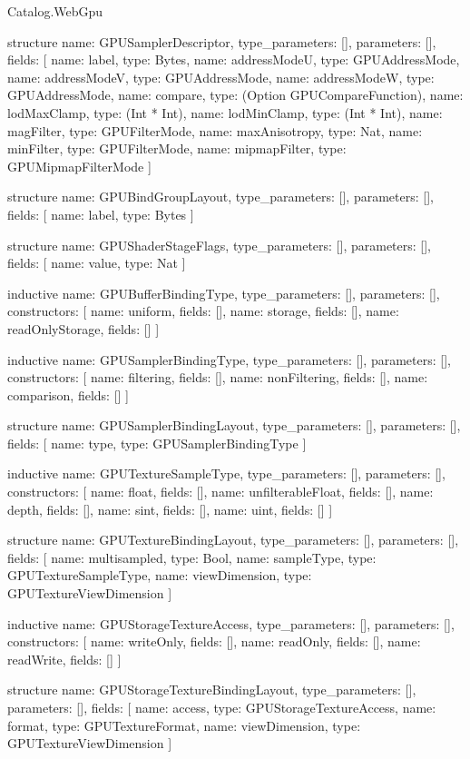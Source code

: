 \begin{lexlean}{Catalog.WebGpu}
\begin{semanticmodule}
structure{
  name: GPUSamplerDescriptor,
  type_parameters: [],
  parameters: [],
  fields: [
    {name: label, type: Bytes},
    {name: addressModeU, type: GPUAddressMode},
    {name: addressModeV, type: GPUAddressMode},
    {name: addressModeW, type: GPUAddressMode},
    {name: compare, type: (Option GPUCompareFunction)},
    {name: lodMaxClamp, type: (Int * Int)},
    {name: lodMinClamp, type: (Int * Int)},
    {name: magFilter, type: GPUFilterMode},
    {name: maxAnisotropy, type: Nat},
    {name: minFilter, type: GPUFilterMode},
    {name: mipmapFilter, type: GPUMipmapFilterMode}
  ]
}

structure{
  name: GPUBindGroupLayout,
  type_parameters: [],
  parameters: [],
  fields: [
    {name: label, type: Bytes}
  ]
}

structure{
  name: GPUShaderStageFlags,
  type_parameters: [],
  parameters: [],
  fields: [
    {name: value, type: Nat}
  ]
}

inductive{
  name: GPUBufferBindingType,
  type_parameters: [],
  parameters: [],
  constructors: [
    {name: uniform, fields: []},
    {name: storage, fields: []},
    {name: readOnlyStorage, fields: []}
  ]
}

inductive{
  name: GPUSamplerBindingType,
  type_parameters: [],
  parameters: [],
  constructors: [
    {name: filtering, fields: []},
    {name: nonFiltering, fields: []},
    {name: comparison, fields: []}
  ]
}

structure{
  name: GPUSamplerBindingLayout,
  type_parameters: [],
  parameters: [],
  fields: [
    {name: type, type: GPUSamplerBindingType}
  ]
}

inductive{
  name: GPUTextureSampleType,
  type_parameters: [],
  parameters: [],
  constructors: [
    {name: float, fields: []},
    {name: unfilterableFloat, fields: []},
    {name: depth, fields: []},
    {name: sint, fields: []},
    {name: uint, fields: []}
  ]
}

structure{
  name: GPUTextureBindingLayout,
  type_parameters: [],
  parameters: [],
  fields: [
    {name: multisampled, type: Bool},
    {name: sampleType, type: GPUTextureSampleType},
    {name: viewDimension, type: GPUTextureViewDimension}
  ]
}

inductive{
  name: GPUStorageTextureAccess,
  type_parameters: [],
  parameters: [],
  constructors: [
    {name: writeOnly, fields: []},
    {name: readOnly, fields: []},
    {name: readWrite, fields: []}
  ]
}

structure{
  name: GPUStorageTextureBindingLayout,
  type_parameters: [],
  parameters: [],
  fields: [
    {name: access, type: GPUStorageTextureAccess},
    {name: format, type: GPUTextureFormat},
    {name: viewDimension, type: GPUTextureViewDimension}
  ]
}


\end{semanticmodule}
\end{lexlean}
